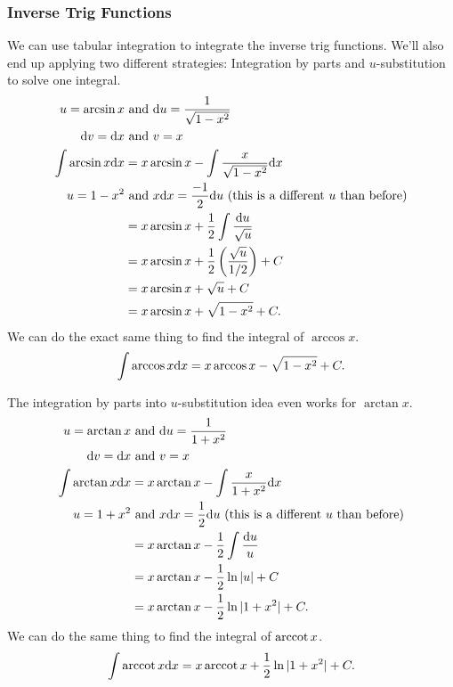 \subsubsection{Inverse Trig Functions}
We can use tabular integration to integrate the inverse trig functions.
We'll also end up applying two different strategies: Integration by parts and $u$-substitution to solve one integral.
\begin{align*}
	u = \arcsin{x} &\text{ and } \mathrm{d} u = \frac{1}{\sqrt{1-x^2}} \\
	\mathrm{d} v = \mathrm{d} x &\text{ and } v = x \\
	\int{\arcsin{x}\mathrm{d} x} &= x\arcsin{x} - \int{\frac{x}{\sqrt{1-x^2}}\mathrm{d} x} \\
	u = 1-x^2 &\text{ and } x\mathrm{d} x = \frac{-1}{2}\mathrm{d} u \text{ (this is a different $u$ than before)} \\
	&= x\arcsin{x} + \frac{1}{2}\int{\frac{\mathrm{d} u}{\sqrt{u}}} \\
	&= x\arcsin{x} + \frac{1}{2}\left(\frac{\sqrt{u}}{1/2}\right) + C \\
	&= x\arcsin{x} + \sqrt{u} + C \\
	&= x\arcsin{x} + \sqrt{1-x^2} + C.
\end{align*}
\noindent
We can do the exact same thing to find the integral of $\arccos{x}$.
\begin{equation*}
	\int{\arccos{x}\mathrm{d} x} = x\arccos{x} - \sqrt{1-x^2} + C.
\end{equation*}

\noindent
The integration by parts into $u$-substitution idea even works for $\arctan{x}$.
\begin{align*}
	u = \arctan{x} &\text{ and } \mathrm{d} u = \frac{1}{1+x^2} \\
	\mathrm{d} v = \mathrm{d} x &\text{ and } v = x \\
	\int{\arctan{x}\mathrm{d} x} &= x\arctan{x} - \int{\frac{x}{1+x^2}\mathrm{d} x} \\
	u = 1+x^2 &\text{ and } x\mathrm{d} x = \frac{1}{2}\mathrm{d} u \text{ (this is a different $u$ than before)} \\
	&= x\arctan{x} - \frac{1}{2}\int{\frac{\mathrm{d} u}{u}} \\
	&= x\arctan{x} - \frac{1}{2}\ln{\lvert u \rvert} + C \\
	&= x\arctan{x} - \frac{1}{2}\ln{\lvert 1+x^2 \rvert} + C.
\end{align*}
\noindent
We can do the same thing to find the integral of $\operatorname{arccot}{x}$.
\begin{equation*}
	\int{\operatorname{arccot}{x}\mathrm{d} x} = x\operatorname{arccot}{x} + \frac{1}{2}\ln{\lvert 1+x^2 \rvert} + C.
\end{equation*}

